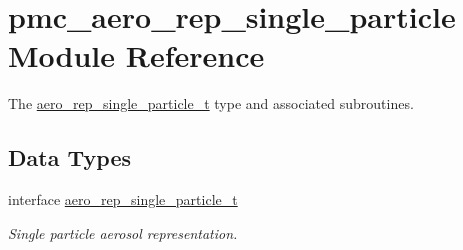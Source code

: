 \hypertarget{namespacepmc__aero__rep__single__particle}{}\section{pmc\+\_\+aero\+\_\+rep\+\_\+single\+\_\+particle Module Reference}
\label{namespacepmc__aero__rep__single__particle}


The \mbox{\hyperlink{structpmc__aero__rep__single__particle_1_1aero__rep__single__particle__t}{aero\+\_\+rep\+\_\+single\+\_\+particle\+\_\+t}} type and associated subroutines.  


\subsection*{Data Types}
\begin{DoxyCompactItemize}
\item 
interface \mbox{\hyperlink{structpmc__aero__rep__single__particle_1_1aero__rep__single__particle__t}{aero\+\_\+rep\+\_\+single\+\_\+particle\+\_\+t}}
\begin{DoxyCompactList}\small\item\em Single particle aerosol representation. \end{DoxyCompactList}\end{DoxyCompactItemize}
